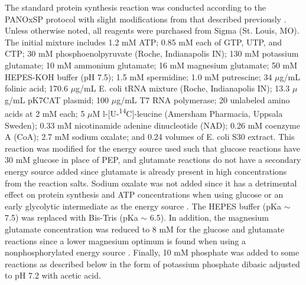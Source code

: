 \documentclass[journal=asbcd6,manuscript=article]{achemso}
\begin{document}
The standard protein synthesis reaction was conducted according to the PANOxSP protocol with slight modifications from that described previously \cite{BIT:BIT20026}.
Unless otherwise noted, all reagents were purchased from Sigma (St. Louis, MO).
The initial mixture includes 1.2 mM ATP; 0.85 mM each of GTP, UTP, and CTP; 30 mM phosphoenolpyruvate (Roche, Indianapolis IN); 130 mM potassium glutamate; 10 mM ammonium glutamate; 16 mM magnesium glutamate; 50 mM HEPES-KOH buffer (pH 7.5); 1.5 mM spermidine; 1.0 mM putrescine; 34 $\mu$g/mL folinic acid; 170.6 $\mu$g/mL E. coli tRNA mixture (Roche, Indianapolis IN); 13.3 $\mu$g/mL pK7CAT plasmid; 100 $\mu$g/mL T7 RNA polymerase; 20 unlabeled amino acids at 2 mM each; 5 $\mu$M l-[U-\textsuperscript{14}C]-leucine (Amersham Pharmacia, Uppsala Sweden); 0.33 mM nicotinamide adenine dinucleotide (NAD); 0.26 mM coenzyme A (CoA); 2.7 mM sodium oxalate; and 0.24 volumes of E. coli S30 extract.
This reaction was modified for the energy source used such that glucose reactions have 30 mM glucose in place of PEP, and glutamate reactions do not have a secondary energy source added since glutamate is already present in high concentrations from the reaction salts. Sodium oxalate was not added since it has a detrimental effect on protein synthesis and ATP concentrations when using glucose or an early glycolytic intermediate as the energy source \cite{BIT:BIT1121}. The HEPES buffer (pKa $\sim$ 7.5) was replaced with Bis-Tris (pKa $\sim$ 6.5). In addition, the magnesium glutamate concentration was reduced to 8 mM for the glucose and glutamate reactions since a lower magnesium optimum is found when using a nonphosphorylated energy source \cite{BIT:BIT20026}. Finally, 10 mM phosphate was added to some reactions as described below in the form of potassium phosphate dibasic adjusted to pH 7.2 with acetic acid.
\end{document}
